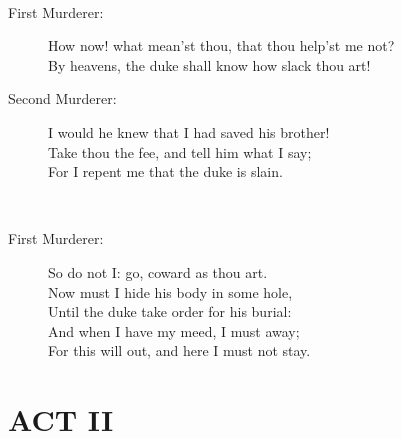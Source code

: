 \documentclass{article}
\begin{document}
\\
\begin{description}
\item[First Murderer:] 
\hspace{1pt}How now! what mean'st thou, that thou help'st me not?\\
\hspace{1pt}By heavens, the duke shall know how slack thou art!\\
\end{description}
\begin{description}
\item[Second Murderer:] 
\hspace{1pt}I would he knew that I had saved his brother!\\
\hspace{1pt}Take thou the fee, and tell him what I say;\\
\hspace{1pt}For I repent me that the duke is slain.\\
\end{description}
\centering{\it [Exit]}\\
\begin{description}
\item[First Murderer:] 
\hspace{1pt}So do not I: go, coward as thou art.\\
\hspace{1pt}Now must I hide his body in some hole,\\
\hspace{1pt}Until the duke take order for his burial:\\
\hspace{1pt}And when I have my meed, I must away;\\
\hspace{1pt}For this will out, and here I must not stay.\\
\end{description}
\section*{ACT II}
\end{document}
